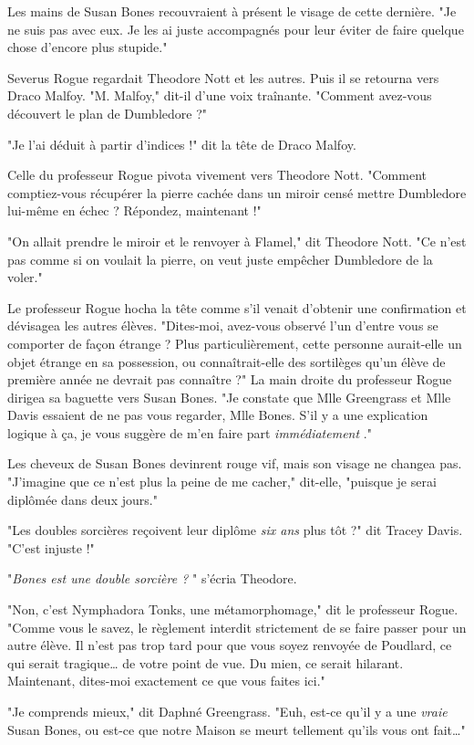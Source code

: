 Les mains de Susan Bones recouvraient à présent le visage de cette dernière. "Je ne suis pas avec eux. Je les ai juste accompagnés pour leur éviter de faire quelque chose d'encore plus stupide."

Severus Rogue regardait Theodore Nott et les autres. Puis il se retourna vers Draco Malfoy. "M. Malfoy," dit-il d'une voix traînante. "Comment avez-vous découvert le plan de Dumbledore ?"

"Je l'ai déduit à partir d'indices !" dit la tête de Draco Malfoy.

Celle du professeur Rogue pivota vivement vers Theodore Nott. "Comment comptiez-vous récupérer la pierre cachée dans un miroir censé mettre Dumbledore lui-même en échec ? Répondez, maintenant !"

"On allait prendre le miroir et le renvoyer à Flamel," dit Theodore Nott. "Ce n'est pas comme si on voulait la pierre, on veut juste empêcher Dumbledore de la voler."

Le professeur Rogue hocha la tête comme s'il venait d'obtenir une confirmation et dévisagea les autres élèves. "Dites-moi, avez-vous observé l'un d'entre vous se comporter de façon étrange ? Plus particulièrement, cette personne aurait-elle un objet étrange en sa possession, ou connaîtrait-elle des sortilèges qu'un élève de première année ne devrait pas connaître ?" La main droite du professeur Rogue dirigea sa baguette vers Susan Bones. "Je constate que Mlle Greengrass et Mlle Davis essaient de ne pas vous regarder, Mlle Bones. S'il y a une explication logique à ça, je vous suggère de m'en faire part \emph{immédiatement} ."

Les cheveux de Susan Bones devinrent rouge vif, mais son visage ne changea pas. "J'imagine que ce n'est plus la peine de me cacher," dit-elle, "puisque je serai diplômée dans deux jours."

"Les doubles sorcières reçoivent leur diplôme \emph{six ans}  plus tôt ?" dit Tracey Davis. "C'est injuste !"

"\emph{Bones est une double sorcière ?} " s'écria Theodore.

"Non, c'est Nymphadora Tonks, une métamorphomage," dit le professeur Rogue. "Comme vous le savez, le règlement interdit strictement de se faire passer pour un autre élève. Il n'est pas trop tard pour que vous soyez renvoyée de Poudlard, ce qui serait tragique… de votre point de vue. Du mien, ce serait hilarant. Maintenant, dites-moi exactement ce que vous faites ici."

"Je comprends mieux," dit Daphné Greengrass. "Euh, est-ce qu'il y a une \emph{vraie}  Susan Bones, ou est-ce que notre Maison se meurt tellement qu'ils vous ont fait…"

